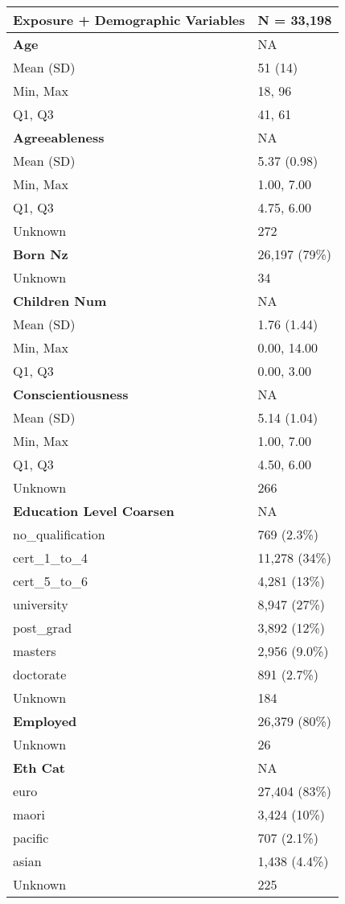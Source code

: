 \documentclass[
  single column]{article}
\begin{document}
\begin{longtable}[]{@{}ll@{}}
\toprule\noalign{}
\textbf{Exposure + Demographic Variables} & \textbf{N = 33,198} \\
\midrule\noalign{}
\endhead
\bottomrule\noalign{}
\endlastfoot
\textbf{Age} & NA \\
Mean (SD) & 51 (14) \\
Min, Max & 18, 96 \\
Q1, Q3 & 41, 61 \\
\textbf{Agreeableness} & NA \\
Mean (SD) & 5.37 (0.98) \\
Min, Max & 1.00, 7.00 \\
Q1, Q3 & 4.75, 6.00 \\
Unknown & 272 \\
\textbf{Born Nz} & 26,197 (79\%) \\
Unknown & 34 \\
\textbf{Children Num} & NA \\
Mean (SD) & 1.76 (1.44) \\
Min, Max & 0.00, 14.00 \\
Q1, Q3 & 0.00, 3.00 \\
\textbf{Conscientiousness} & NA \\
Mean (SD) & 5.14 (1.04) \\
Min, Max & 1.00, 7.00 \\
Q1, Q3 & 4.50, 6.00 \\
Unknown & 266 \\
\textbf{Education Level Coarsen} & NA \\
no\_qualification & 769 (2.3\%) \\
cert\_1\_to\_4 & 11,278 (34\%) \\
cert\_5\_to\_6 & 4,281 (13\%) \\
university & 8,947 (27\%) \\
post\_grad & 3,892 (12\%) \\
masters & 2,956 (9.0\%) \\
doctorate & 891 (2.7\%) \\
Unknown & 184 \\
\textbf{Employed} & 26,379 (80\%) \\
Unknown & 26 \\
\textbf{Eth Cat} & NA \\
euro & 27,404 (83\%) \\
maori & 3,424 (10\%) \\
pacific & 707 (2.1\%) \\
asian & 1,438 (4.4\%) \\
Unknown & 225 \\

\end{longtable}
\end{document}
